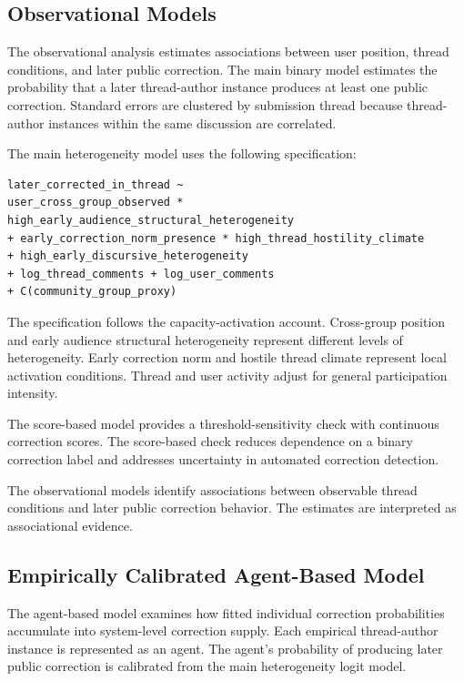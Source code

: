\documentclass[namedate,unnumsec,webpdf,contemporary,large]{oup-authoring-template}
\begin{document}
\subsection{Observational Models}


The observational analysis estimates associations between user position, thread conditions, and later public correction. The main binary model estimates the probability that a later thread-author instance produces at least one public correction. Standard errors are clustered by submission thread because thread-author instances within the same discussion are correlated.

The main heterogeneity model uses the following specification:

\begin{verbatim}
later_corrected_in_thread ~
user_cross_group_observed * high_early_audience_structural_heterogeneity
+ early_correction_norm_presence * high_thread_hostility_climate
+ high_early_discursive_heterogeneity
+ log_thread_comments + log_user_comments
+ C(community_group_proxy)
\end{verbatim}

The specification follows the capacity-activation account. Cross-group position and early audience structural heterogeneity represent different levels of heterogeneity. Early correction norm and hostile thread climate represent local activation conditions. Thread and user activity adjust for general participation intensity.

The score-based model provides a threshold-sensitivity check with continuous correction scores. The score-based check reduces dependence on a binary correction label and addresses uncertainty in automated correction detection.

The observational models identify associations between observable thread conditions and later public correction behavior. The estimates are interpreted as associational evidence.

\subsection{Empirically Calibrated Agent-Based Model}


The agent-based model examines how fitted individual correction probabilities accumulate into system-level correction supply. Each empirical thread-author instance is represented as an agent. The agent's probability of producing later public correction is calibrated from the main heterogeneity logit model.
\end{document}
